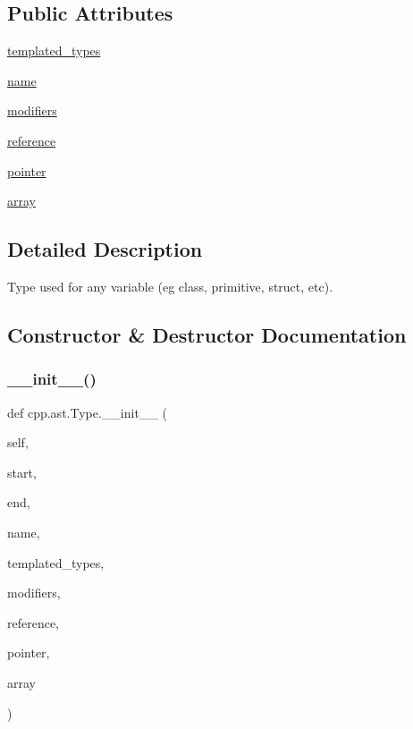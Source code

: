 \subsection*{Public Attributes}
\begin{DoxyCompactItemize}
\item 
\mbox{\hyperlink{classcpp_1_1ast_1_1_type_a7c38fcafa00dae6ee22bab783086a1a7}{templated\+\_\+types}}
\item 
\mbox{\hyperlink{classcpp_1_1ast_1_1_type_a5905424e2b65f0215b6ecd73b4bfe24c}{name}}
\item 
\mbox{\hyperlink{classcpp_1_1ast_1_1_type_a0effa0a077eda79943e881955b4c51a5}{modifiers}}
\item 
\mbox{\hyperlink{classcpp_1_1ast_1_1_type_a8d2cddd631397c3bf86198cc420d584d}{reference}}
\item 
\mbox{\hyperlink{classcpp_1_1ast_1_1_type_a37234bb68915c93894cbc8e366c1eaad}{pointer}}
\item 
\mbox{\hyperlink{classcpp_1_1ast_1_1_type_a1fd0493e82da315bcb4c02b0cf2133a3}{array}}
\end{DoxyCompactItemize}


\subsection{Detailed Description}
\begin{DoxyVerb}Type used for any variable (eg class, primitive, struct, etc).\end{DoxyVerb}
 

\subsection{Constructor \& Destructor Documentation}
\mbox{\label{classcpp_1_1ast_1_1_type_adc20d88db721b5d7b513c08a4d6753c9}} 
\subsubsection{\texorpdfstring{\_\_init\_\_()}{\_\_init\_\_()}}
{\footnotesize\ttfamily def cpp.\+ast.\+Type.\+\_\+\+\_\+init\+\_\+\+\_\+ (\begin{DoxyParamCaption}\item[{}]{self,  }\item[{}]{start,  }\item[{}]{end,  }\item[{}]{name,  }\item[{}]{templated\+\_\+types,  }\item[{}]{modifiers,  }\item[{}]{reference,  }\item[{}]{pointer,  }\item[{}]{array }\end{DoxyParamCaption})}

